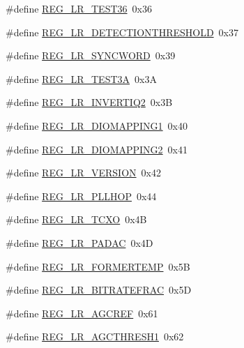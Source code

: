 \begin{DoxyCompactItemize}
\item 
\#define \hyperlink{sx1276Regs-LoRa_8h_a08173e8721d25c6ab32e8aa4c157751d}{R\+E\+G\+\_\+\+L\+R\+\_\+\+T\+E\+S\+T36}~0x36
\item 
\#define \hyperlink{sx1276Regs-LoRa_8h_abc835e71071bd5f3bd52f54168d6e4b7}{R\+E\+G\+\_\+\+L\+R\+\_\+\+D\+E\+T\+E\+C\+T\+I\+O\+N\+T\+H\+R\+E\+S\+H\+O\+LD}~0x37
\item 
\#define \hyperlink{sx1276Regs-LoRa_8h_a9da3702bd320fa729cb809d07ef0c38a}{R\+E\+G\+\_\+\+L\+R\+\_\+\+S\+Y\+N\+C\+W\+O\+RD}~0x39
\item 
\#define \hyperlink{sx1276Regs-LoRa_8h_a4dd28b78370d8732b9d149f71826e62d}{R\+E\+G\+\_\+\+L\+R\+\_\+\+T\+E\+S\+T3A}~0x3A
\item 
\#define \hyperlink{sx1276Regs-LoRa_8h_a83e2628ed2b5dcf9d0a30e7317b9a560}{R\+E\+G\+\_\+\+L\+R\+\_\+\+I\+N\+V\+E\+R\+T\+I\+Q2}~0x3B
\item 
\#define \hyperlink{sx1276Regs-LoRa_8h_a153226eac782c0908150527e844dc42f}{R\+E\+G\+\_\+\+L\+R\+\_\+\+D\+I\+O\+M\+A\+P\+P\+I\+N\+G1}~0x40
\item 
\#define \hyperlink{sx1276Regs-LoRa_8h_a13a4beabb022493d7f714e49e44e1715}{R\+E\+G\+\_\+\+L\+R\+\_\+\+D\+I\+O\+M\+A\+P\+P\+I\+N\+G2}~0x41
\item 
\#define \hyperlink{sx1276Regs-LoRa_8h_a8161394887fc1ff67af883e55afa006e}{R\+E\+G\+\_\+\+L\+R\+\_\+\+V\+E\+R\+S\+I\+ON}~0x42
\item 
\#define \hyperlink{sx1276Regs-LoRa_8h_af71d93b5478ef3e6058e3787a1095503}{R\+E\+G\+\_\+\+L\+R\+\_\+\+P\+L\+L\+H\+OP}~0x44
\item 
\#define \hyperlink{sx1276Regs-LoRa_8h_ab7ec38544ea3e38b672c3c786607b3ea}{R\+E\+G\+\_\+\+L\+R\+\_\+\+T\+C\+XO}~0x4B
\item 
\#define \hyperlink{sx1276Regs-LoRa_8h_a0fe80f278fb8bf0702faad66404d4a5c}{R\+E\+G\+\_\+\+L\+R\+\_\+\+P\+A\+D\+AC}~0x4D
\item 
\#define \hyperlink{sx1276Regs-LoRa_8h_a8eedbc42b755b17b123d3ecdb8d785b8}{R\+E\+G\+\_\+\+L\+R\+\_\+\+F\+O\+R\+M\+E\+R\+T\+E\+MP}~0x5B
\item 
\#define \hyperlink{sx1276Regs-LoRa_8h_ab2660874b741525fc0424f8b0c59fb00}{R\+E\+G\+\_\+\+L\+R\+\_\+\+B\+I\+T\+R\+A\+T\+E\+F\+R\+AC}~0x5D
\item 
\#define \hyperlink{sx1276Regs-LoRa_8h_a3ad00cd303907ff68744172e6bf219c8}{R\+E\+G\+\_\+\+L\+R\+\_\+\+A\+G\+C\+R\+EF}~0x61
\item 
\#define \hyperlink{sx1276Regs-LoRa_8h_a5b15d639723d2681ebaa2d5f31286ce5}{R\+E\+G\+\_\+\+L\+R\+\_\+\+A\+G\+C\+T\+H\+R\+E\+S\+H1}~0x62

\end{DoxyCompactItemize}
